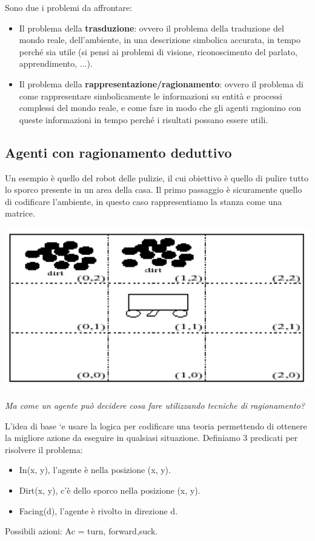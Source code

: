Sono due i problemi da affrontare:
\begin{itemize}
    \item Il problema della \textbf{trasduzione}: ovvero il problema della traduzione del mondo reale, dell’ambiente, in una descrizione simbolica accurata, in tempo perché sia utile (si pensi ai problemi di visione, riconoscimento del parlato, apprendimento, ...).
    \item Il problema della \textbf{rappresentazione/ragionamento}: ovvero il problema di come rappresentare simbolicamente le informazioni su entità e processi complessi del mondo reale, e come fare in modo che gli agenti ragionino con queste informazioni in tempo perché i risultati possano essere utili.
\end{itemize} 

\subsection{Agenti con ragionamento deduttivo}
Un esempio è quello del robot delle pulizie, il cui obiettivo è quello di pulire tutto lo sporco presente in un area della casa. Il primo passaggio è sicuramente quello di codificare l'ambiente, in questo caso rappresentiamo la stanza come una matrice.
\begin{center}
    \includegraphics[scale=0.4]{images/vacuum world.PNG}
\end{center}
\textit{Ma come un agente può decidere cosa fare utilizzando tecniche di ragionamento?}

L’idea di base `e usare la logica per codificare una teoria permettendo di ottenere la migliore azione da eseguire in qualsiasi situazione.
Definiamo 3 predicati per risolvere il problema:
\begin{itemize}
    \item In(x, y), l’agente è nella posizione (x, y).
    \item Dirt(x, y), c'è dello sporco nella posizione (x, y).
    \item Facing(d), l’agente è rivolto in direzione d.
\end{itemize}
Possibili azioni: Ac = {turn, forward,suck}.
\newpage

